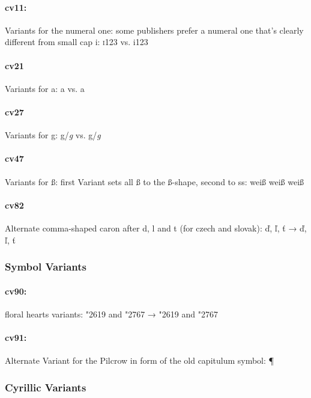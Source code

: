 \documentclass[pagesize,DIV14]{scrartcl}
\begin{document}
\paragraph*{cv11:} Variants for the numeral one: some publishers prefer a numeral one that’s clearly different from small cap i: \textsc{i123} vs. {i123}

\paragraph*{cv21} Variants for a: a vs. {a}

\paragraph*{cv27} Variants for g: g/\textit{g} vs. {g/\textit{g}}

\paragraph*{cv47} Variants for ß: first Variant sets all ß to the ß-shape, second to ss: {weiß {weiß} {weiß}}

\paragraph*{cv82} Alternate comma-shaped caron after d, l and t (for czech and slovak): ď, ľ, ť → {ď, ľ, ť}

\subsubsection{Symbol Variants}
\paragraph*{cv90:} floral hearts variants: \char"2619{}  and \char"2767{}  → {\char"2619{} and \char"2767}

\paragraph*{cv91:} Alternate Variant for the Pilcrow in form of the old capitulum symbol: {¶}

\subsubsection{Cyrillic Variants}
\end{document}
